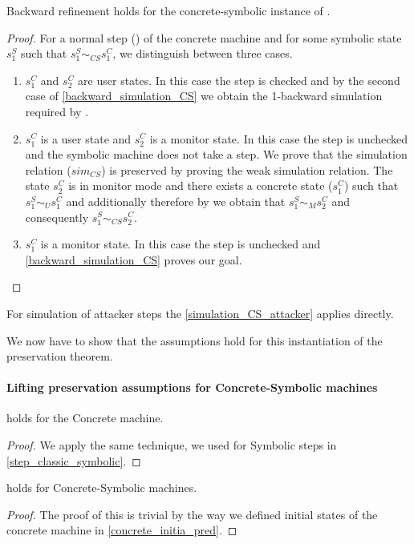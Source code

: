 \begin{theorem}
\label{backward_refinement_normal_CS}
  Backward refinement holds for the concrete-symbolic instance
  of .
\end{theorem}
\begin{proof}
  For a normal step () of the concrete machine and
  for some symbolic state $s^S_1$ such that $s^S_1 \sim_{CS} s^C_1$,
  we distinguish between three cases.

  \begin{enumerate}
  \item $s^C_1$ and $s^C_2$ are user states. In this case the step is
    checked and by the second case of \cref{backward_simulation_CS} we obtain
    the 1-backward simulation required by .
  \item $s^C_1$ is a user state and $s^C_2$ is a monitor state. In this case
    the step is unchecked and the symbolic machine does not take a step.
    We prove that the simulation relation ($sim_{CS}$) is preserved by
    proving the weak simulation relation. The state $s^C_2$ is in
    monitor mode and there exists a concrete state ($s^C_1$) such that
    $s^S_1 \sim_U s^C_1$ and additionally  therefore
    by  we obtain that
    $s^S_1 \sim_M s^C_2$ and consequently $s^S_1 \sim_{CS} s^C_2$.
  \item $s^C_1$ is a monitor state. In this case the step is
    unchecked and \cref{backward_simulation_CS} proves
    our goal.
  \end{enumerate}
\end{proof}

For simulation of attacker steps the \cref{simulation_CS_attacker}
applies directly.

We now have to show that the assumptions
hold for this instantiation of the preservation theorem.

\paragraph{Lifting preservation assumptions for Concrete-Symbolic machines}

\begin{lemma}
  \label{step_classic_concrete}
   holds for the Concrete machine.
\end{lemma}
\begin{proof}
  We apply the same technique, we used for Symbolic steps in
  \cref{step_classic_symbolic}.
\end{proof}
\begin{lemma}
  \label{initial_refine_CS}
   holds for Concrete-Symbolic machines.
\end{lemma}
\begin{proof}
  The proof of this is trivial by the way we defined initial states of
  the concrete machine in \cref{concrete_initia_pred}.
\end{proof}

